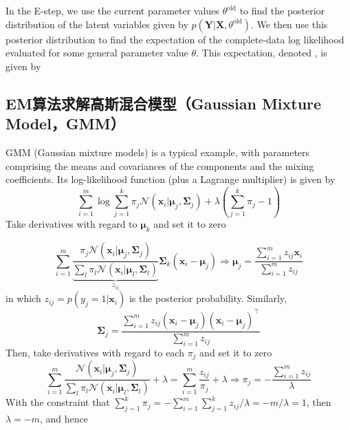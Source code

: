 \documentclass{article}
\begin{document}
	In the E-step, we use the current parameter values $\theta^{\mathrm{old}}$ to find the posterior distribution of the latent variables given by $p(\bm{Y}|\bm{X}, \theta^{\mathrm{old}})$. We then use this posterior distribution to find the expectation of the complete-data log likelihood evaluated for some general parameter value $\theta$. This expectation, denoted , is given by
	
	\subsection{EM算法求解高斯混合模型（Gaussian Mixture Model，GMM）}
	
	GMM (Gaussian mixture models) is a typical example, with parameters comprising the means and covariances of the components and the mixing coefficients. Its log-likelihood function (plus a Lagrange multiplier) is given by
	\begin{equation*}
	\sum_{i=1}^m \log \sum_{j=1}^k \pi_j \mathcal{N} (\bm{x}_i|\bm{\mu}_j,\bm{\Sigma}_j) + \lambda \left(\sum_{j=1}^k \pi_j - 1\right)
	\end{equation*}
	Take derivatives with regard to $\bm{\mu}_k$ and set it to zero
	
	\begin{equation}
	\label{eq:GMM_mu}
	\sum_{i=1}^m \underbrace{\frac{\pi_j  \mathcal{N} (\bm{x}_i|\bm{\mu}_j,\bm{\Sigma}_j)}{\sum_l \pi_l \mathcal{N} (\bm{x}_i|\bm{\mu}_l,\bm{\Sigma}_l)}}_{z_{ij}} \bm{\Sigma}_k (\bm{x}_i - \bm{\mu}_j) \Longrightarrow \bm{\mu}_j=\frac{\sum_{i=1}^m z_{ij} \bm{x}_i}{\sum_{i=1}^m z_{ij}}
	\end{equation}
in which $z_{ij}=p(y_j=1|\bm{x}_i)$ is the posterior probability. Similarly,
	\begin{equation}
	\label{eq:GMM_sigma}
	\bm{\Sigma}_j=\frac{\sum_{i=1}^m z_{ij} (\bm{x}_i-\bm{\mu}_j)(\bm{x}_i-\bm{\mu}_j)^\top}{\sum_{i=1}^m z_{ij}}
	\end{equation}
	Then, take derivatives with regard to each $\pi_j$ and set it to zero
	\begin{equation*}
	\sum_{i=1}^m \frac{\mathcal{N} (\bm{x}_i|\bm{\mu}_j,\bm{\Sigma}_j) }{\sum_l \pi_l \mathcal{N} (\bm{x}_i|\bm{\mu}_l,\bm{\Sigma}_l)} + \lambda = \sum_{i=1}^m \frac{z_{ij}}{\pi_j} + \lambda \Longrightarrow \pi_j=-\frac{\sum_{i=1}^m z_{ij}}{\lambda}
	\end{equation*}
With the constraint that $\sum_{j=1}^k\pi_j=-\sum_{i=1}^m\sum_{j=1}^k z_{ij}/\lambda = -m/\lambda=1$, then $\lambda=-m$, and hence
\end{document}
